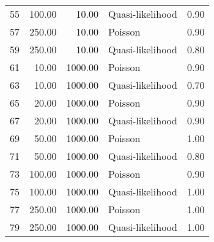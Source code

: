 \begin{table}[ht]
\begin{tabular}{rrrlr}
  55 & 100.00 & 10.00 & Quasi-likelihood & 0.90 \\ 
  57 & 250.00 & 10.00 & Poisson & 0.90 \\ 
  59 & 250.00 & 10.00 & Quasi-likelihood & 0.80 \\ 
  61 & 10.00 & 1000.00 & Poisson & 0.90 \\ 
  63 & 10.00 & 1000.00 & Quasi-likelihood & 0.70 \\ 
  65 & 20.00 & 1000.00 & Poisson & 0.90 \\ 
  67 & 20.00 & 1000.00 & Quasi-likelihood & 0.90 \\ 
  69 & 50.00 & 1000.00 & Poisson & 1.00 \\ 
  71 & 50.00 & 1000.00 & Quasi-likelihood & 0.80 \\ 
  73 & 100.00 & 1000.00 & Poisson & 0.90 \\ 
  75 & 100.00 & 1000.00 & Quasi-likelihood & 1.00 \\ 
  77 & 250.00 & 1000.00 & Poisson & 1.00 \\ 
  79 & 250.00 & 1000.00 & Quasi-likelihood & 1.00 \\ 
   \hline
\end{tabular}
\end{table}
